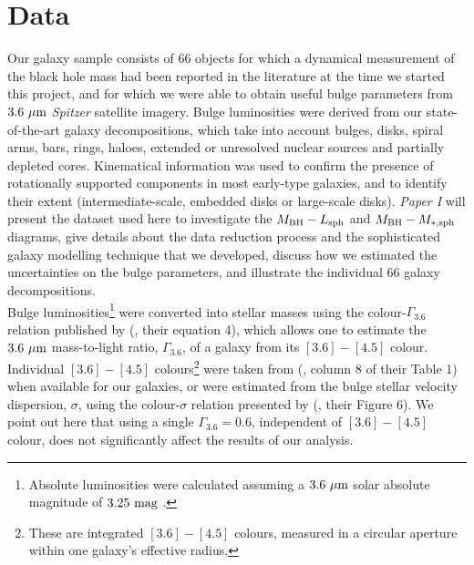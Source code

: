 \documentclass[preprint2]{emulateapj}
\begin{document}
 

\section{Data}
\label{sec:data}
Our galaxy sample consists of 66 objects for which a dynamical measurement of the black hole mass had been reported in the literature 
\citep{grahamscott2013,rusli2013bhmassesDM} at the time we started this project, 
and for which we were able to obtain useful bulge parameters from $3.6\rm~\mu m$ \emph{Spitzer} satellite imagery. 
Bulge luminosities were derived from our state-of-the-art galaxy decompositions, which take into account 
bulges, disks, spiral arms, bars, rings, haloes, extended or unresolved nuclear sources and partially depleted cores.
Kinematical information \citep{atlas3dIII-MNRAS,scott2014,arnold2014} was used 
to confirm the presence of rotationally supported components in most early-type galaxies, 
and to identify their extent (intermediate-scale, embedded disks or large-scale disks). 
\emph{Paper I} will present the dataset used here to investigate the $M_{\rm BH} - L_{\rm sph}$ and $M_{\rm BH} - M_{\rm *,sph}$ diagrams, 
give details about the data reduction process and the sophisticated galaxy modelling technique that we developed, 
discuss how we estimated the uncertainties on the bulge parameters, 
and illustrate the individual 66 galaxy decompositions. \\
Bulge luminosities\footnote{Absolute luminosities were calculated assuming a $3.6\rm~\mu m$ solar absolute magnitude of $3.25\rm~mag$ \citep{sani2011}.} 
were converted into stellar masses using the colour-$\Gamma_{3.6}$ relation published by 
\citeauthor{meidt2014} (\citeyear{meidt2014}, their equation 4), 
which allows one to estimate the $3.6\rm~\mu m$ mass-to-light ratio, $\Gamma_{3.6}$, of a galaxy 
from its $[3.6] - [4.5]$ colour. 
Individual $[3.6] - [4.5]$ colours\footnote{These are integrated $[3.6] - [4.5]$ colours, measured in a circular aperture 
within one galaxy's effective radius.} were taken from 
\citeauthor{peletier2012} (\citeyear{peletier2012}, column 8 of their Table 1) 
when available for our galaxies, 
or were estimated from the bulge stellar velocity dispersion, $\sigma$, 
using the colour-$\sigma$ relation presented by \citeauthor{peletier2012} (\citeyear{peletier2012}, their Figure 6).
We point out here that using a single $\Gamma_{3.6} = 0.6$, independent of $[3.6] - [4.5]$ colour, 
does not significantly affect the results of our analysis.



\end{document}
